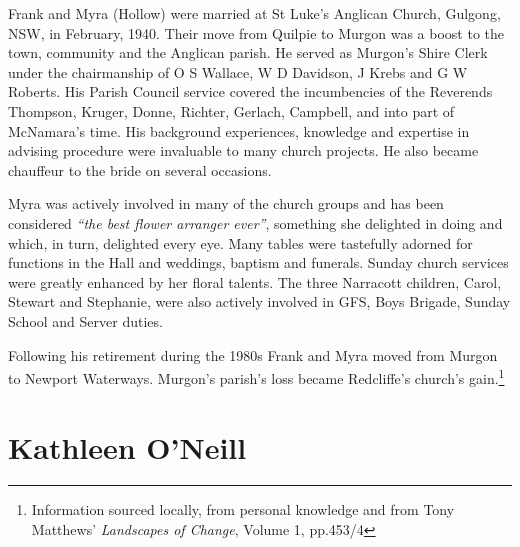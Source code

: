 Frank and Myra (Hollow) were married at St Luke's Anglican Church, Gulgong, NSW, in February, 1940. Their move from Quilpie to Murgon was a boost to the town, community and the Anglican parish. He served as Murgon's Shire Clerk under the chairmanship of O S Wallace, W D Davidson, J Krebs and G W Roberts. His Parish Council service covered the incumbencies of the Reverends Thompson, Kruger, Donne, Richter, Gerlach, Campbell, and into part of McNamara's time. His background experiences, knowledge and expertise in advising procedure were invaluable to many church projects. He also became chauffeur to the bride on several occasions.



Myra was actively involved in many of the church groups and has been considered \emph{``the best flower arranger ever''}, something she delighted in doing and which, in turn, delighted every eye. Many tables were tastefully adorned for functions in the Hall and weddings, baptism and funerals. Sunday church services were greatly enhanced by her floral talents. The three Narracott children, Carol, Stewart and Stephanie, were also actively involved in GFS, Boys Brigade, Sunday School and Server duties.



Following his retirement during the 1980s Frank and Myra moved from Murgon to Newport Waterways. Murgon's parish's loss became Redcliffe's church's gain.\footnote{Information sourced locally, from personal knowledge and from Tony Matthews' \emph{Landscapes of Change}, Volume 1, pp.453/4}


\section{Kathleen O'Neill}



